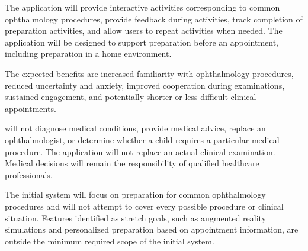 \documentclass[12pt]{article}
\begin{document}
The application will provide interactive activities corresponding to common ophthalmology
procedures, provide feedback during activities, track completion of preparation activities, and
allow users to repeat activities when needed. The application will be designed to support
preparation before an appointment, including preparation in a home environment.

The expected benefits are increased familiarity with ophthalmology procedures, reduced uncertainty
and anxiety, improved cooperation during examinations, sustained engagement, and potentially
shorter or less difficult clinical appointments.

\progname{} will not diagnose medical conditions, provide medical advice, replace an ophthalmologist,
or determine whether a child requires a particular medical procedure. The application will not
replace an actual clinical examination. Medical decisions will remain the responsibility of qualified
healthcare professionals.

The initial system will focus on preparation for common ophthalmology procedures and will not
attempt to cover every possible procedure or clinical situation. Features identified as stretch
goals, such as augmented reality simulations and personalized preparation based on appointment
information, are outside the minimum required scope of the initial system.
\end{document}
